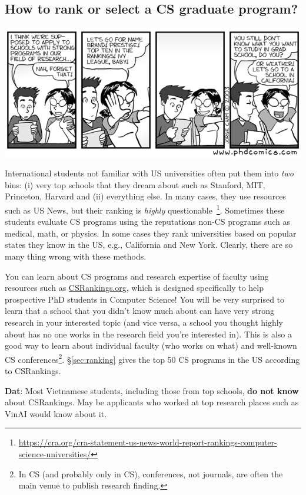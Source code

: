 \documentclass[11pt]{article}
\newenvironment{commentbox}[1][]{
\small
    \begin{cbox}
    \textbf{#1}: 
 }{
   \end{cbox}
}
\begin{document}
\subsection{How to rank or select a CS graduate program?}
   \begin{center}
    \includegraphics[scale=0.5]{c1.png}
   \end{center}

International students not familiar with US universities often put them into \emph{two} bins:  (i) very top schools that they dream about such as Stanford, MIT, Princeton, Harvard and (ii) everything else.  In many cases, they use resources such as US News, but their ranking is \emph{highly} questionable~\footnote{\url{https://cra.org/cra-statement-us-news-world-report-rankings-computer-science-universities/}}.  Sometimes these students evaluate CS programs using the reputations non-CS programs such as medical, math, or physics.
In some cases they rank universities based on popular states they know in the US, e.g., California and New York.  Clearly, there are so many thing wrong with these methods. 

You can learn about CS programs and research expertise of faculty using resources such as \href{https://csrankings.org}{CSRankings.org}, which is designed specifically to help prospective PhD students in Computer Science!  You will be very surprised to learn that a school that you didn't know much about can have very strong research in your interested topic (and vice versa, a school you thought highly about has no one works in the research field you're interested in). This is also a good way to learn about individual faculty (who works on what) and well-known CS conferences\footnote{In CS (and probably only in CS), conferences, not journals, are often the main venue to publish research finding.}. \S\ref{sec:ranking} gives the top 50 CS programs in the US according to CSRankings.

\begin{commentbox}[Dat] Most Vietnamese students, including those from top schools, \textbf{do not know} about CSRankings.  May be applicants who worked at top research places such as VinAI would know about it.
\end{commentbox}
\end{document}
